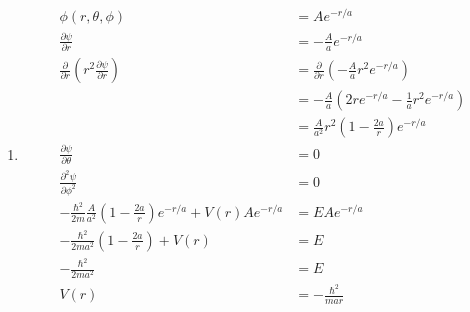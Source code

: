 \documentclass{article}
\begin{document}
\subsection{}

\begin{enumerate}
  \item

        \begin{align*}
          \phi(r, \theta, \phi)                                                                              & = A e^{-r / a}                                                            \\
          \frac{\partial \psi}{\partial r}                                                                   & = -\frac{A}{a} e^{-r / a}                                                 \\
          \frac{\partial}{\partial r} \left( r^2 \frac{\partial \psi}{\partial r} \right)                    & = \frac{\partial}{\partial r} \left( -\frac{A}{a} r^2 e^{-r / a} \right)  \\
                                                                                                             & = -\frac{A}{a} \left( 2 r e^{-r / a} - \frac{1}{a} r^2 e^{-r / a} \right) \\
                                                                                                             & = \frac{A}{a^2} r^2 \left( 1 - \frac{2 a}{r} \right) e^{-r / a}           \\
          \frac{\partial \psi}{\partial \theta}                                                              & = 0                                                                       \\
          \frac{\partial^2 \psi}{\partial \phi^2}                                                            & = 0                                                                       \\
          -\frac{\hbar^2}{2 m} \frac{A}{a^2} \left( 1 - \frac{2 a}{r} \right) e^{-r / a} + V(r) A e^{-r / a} & = E A e^{-r / a}                                                          \\
          -\frac{\hbar^2}{2 m a^2} \left( 1 - \frac{2 a}{r} \right) + V(r)                                   & = E                                                                       \\
          -\frac{\hbar^2}{2 m a^2}                                                                           & = E                                                                       \\
          V(r)                                                                                               & = -\frac{\hbar^2}{m a r}
        \end{align*}


\end{enumerate}
\end{document}
